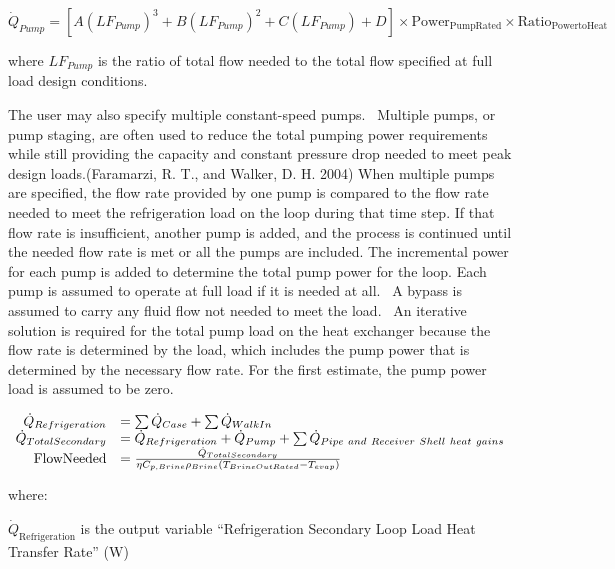 \begin{equation}
{\dot Q_{Pump}} = \left[ {A{{\left( {L{F_{Pump}}} \right)}^3} + B{{\left( {L{F_{Pump}}} \right)}^2} + C\left( {L{F_{Pump}}} \right) + D} \right] \times {\mathrm{Powe}}{{\mathrm{r}}_{{\mathrm{PumpRated}}}} \times {\mathrm{Rati}}{{\mathrm{o}}_{{\mathrm{PowertoHeat}}}}
\end{equation}

where \(LF_{Pump}\) is the ratio of total flow needed to the total flow specified at full load design conditions.

The user may also specify multiple constant-speed pumps.~ Multiple pumps, or pump staging, are often used to reduce the total pumping power requirements while still providing the capacity and constant pressure drop needed to meet peak design loads.(Faramarzi, R. T., and Walker, D. H. 2004) When multiple pumps are specified, the flow rate provided by one pump is compared to the flow rate needed to meet the refrigeration load on the loop during that time step. If that flow rate is insufficient, another pump is added, and the process is continued until the needed flow rate is met or all the pumps are included. The incremental power for each pump is added to determine the total pump power for the loop. Each pump is assumed to operate at full load if it is needed at all.~ A bypass is assumed to carry any fluid flow not needed to meet the load.~ An iterative solution is required for the total pump load on the heat exchanger because the flow rate is determined by the load, which includes the pump power that is determined by the necessary flow rate. For the first estimate, the pump power load is assumed to be zero.

\begin{equation}
  \begin{array}{rl}
    \dot{Q}_{Refrigeration} &= \sum \dot{Q}_{Case} + \sum \dot{Q}_{WalkIn} \\
    \dot{Q}_{TotalSecondary} &= \dot{Q}_{Refrigeration} + \dot{Q}_{Pump} + \sum \dot{Q}_{Pipe~and~Receiver~Shell~heat~gains} \\
    \text{FlowNeeded} &= \frac{\dot{Q}_{TotalSecondary}}{\eta C_{p,Brine} \rho_{Brine}\left(T_{BrineOutRated} - T_{evap}\right)}
  \end{array}
\end{equation}

where:

\({\dot Q_{{\mathrm{Refrigeration}}}}\) is the output variable ``Refrigeration Secondary Loop Load Heat Transfer Rate'' (W)

